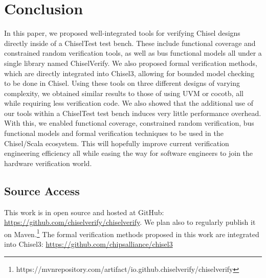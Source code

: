 \documentclass[conference]{IEEEtran}
\begin{document}
\section{Conclusion}
\label{sec:conclude}

In this paper, we proposed well-integrated tools for verifying Chisel designs directly inside of a ChiselTest test bench. 
These include functional coverage and constrained random verification tools, as well as bus functional models all under a single library named ChiselVerify.
We also proposed formal verification methods, which are directly integrated into Chisel3, allowing for bounded model checking to be done in Chisel.
Using these tools on three different designs of varying complexity, we obtained similar results to those of using UVM or cocotb, all while requiring less verification code.
We also showed that the additional use of our tools within a ChiselTest test bench induces very little performance overhead.
With this, we enabled functional coverage, constrained random verification, bus functional models and formal verification techniques to be used in the Chisel/Scala ecosystem.
This will hopefully improve current verification engineering efficiency all while easing the way for software engineers to join the hardware verification world.

\subsection*{Source Access}

This work is in open source and hosted at GitHub:\\ \url{https://github.com/chiselverify/chiselverify}.
We plan also to regularly publish it on Maven.\footnote{https://mvnrepository.com/artifact/io.github.chiselverify/chiselverify}
The formal verification methods proposed in this work are integrated into Chisel3: \url{https://github.com/chipsalliance/chisel3}

\end{document}
